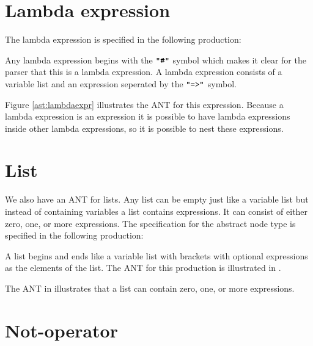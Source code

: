 

\section{Lambda expression}

The lambda expression is specified in the following production:

\begin{ebnf}
\end{ebnf}

Any lambda expression begins with the $\texttt{"\#"}$ symbol which makes it clear for the
parser that this is a lambda expression. A lambda expression consists of a
variable list and an expression seperated by the $\texttt{"=>"}$ symbol.



Figure \ref{ast:lambdaexpr} illustrates the ANT for this expression. Because a
lambda expression is an expression it is possible to have lambda expressions
inside other lambda expressions, so it is possible to nest these expressions.

\section{List}

We also have an ANT for lists. Any list can be empty
just like a variable list but instead of containing variables a list contains
expressions. It can consist of either zero, one, or more expressions. The
specification for the abstract node type is specified in the following
production:

\begin{ebnf}
\end{ebnf}

A list begins and ends like a variable list with brackets with optional
expressions as the elements of the list. The ANT for this production is illustrated
in .



The ANT in  illustrates that a list can contain zero, one, or
more expressions.

\section{Not-operator}


